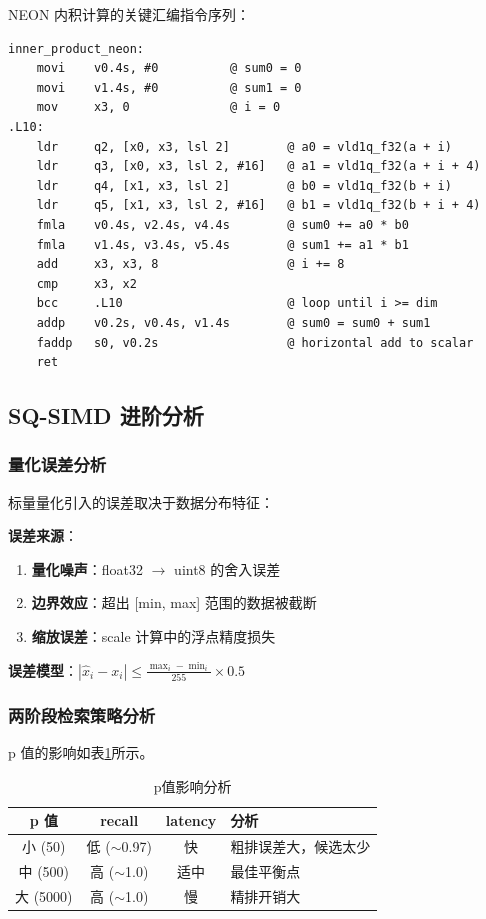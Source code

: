 \documentclass[a4paper]{article}
\begin{document}
NEON 内积计算的关键汇编指令序列：

\begin{lstlisting}[frame=single, basicstyle=\ttfamily\scriptsize]
inner_product_neon:
    movi    v0.4s, #0          @ sum0 = 0
    movi    v1.4s, #0          @ sum1 = 0
    mov     x3, 0              @ i = 0
.L10:
    ldr     q2, [x0, x3, lsl 2]        @ a0 = vld1q_f32(a + i)
    ldr     q3, [x0, x3, lsl 2, #16]   @ a1 = vld1q_f32(a + i + 4)
    ldr     q4, [x1, x3, lsl 2]        @ b0 = vld1q_f32(b + i)
    ldr     q5, [x1, x3, lsl 2, #16]   @ b1 = vld1q_f32(b + i + 4)
    fmla    v0.4s, v2.4s, v4.4s        @ sum0 += a0 * b0
    fmla    v1.4s, v3.4s, v5.4s        @ sum1 += a1 * b1
    add     x3, x3, 8                  @ i += 8
    cmp     x3, x2
    bcc     .L10                       @ loop until i >= dim
    addp    v0.2s, v0.4s, v1.4s        @ sum0 = sum0 + sum1
    faddp   s0, v0.2s                  @ horizontal add to scalar
    ret
\end{lstlisting}

\subsection{SQ-SIMD 进阶分析}

\subsubsection{量化误差分析}

标量量化引入的误差取决于数据分布特征：

\textbf{误差来源}：
\begin{enumerate}
  \item \textbf{量化噪声}：float32 $\rightarrow$ uint8 的舍入误差
  \item \textbf{边界效应}：超出 [min, max] 范围的数据被截断
  \item \textbf{缩放误差}：scale 计算中的浮点精度损失
\end{enumerate}

\textbf{误差模型}：$|\hat{x}_i - x_i| \leq \frac{\max_i - \min_i}{255} \times 0.5$

\subsubsection{两阶段检索策略分析}

p 值的影响如表\ref{table:p_analysis}所示。

\begin{table}[!htbp]
  \centering
  \begin{tabular}{cccl}
  \toprule  
  \textbf{p 值} & \textbf{recall} & \textbf{latency} & \textbf{分析} \\
  \midrule
  小 (50) & 低 ($\sim$0.97) & 快 & 粗排误差大，候选太少 \\
  中 (500) & 高 ($\sim$1.0) & 适中 & 最佳平衡点 \\
  大 (5000) & 高 ($\sim$1.0) & 慢 & 精排开销大 \\
  \bottomrule
  \end{tabular}
  \caption{p值影响分析}
  \label{table:p_analysis}
\end{table}
\end{document}
